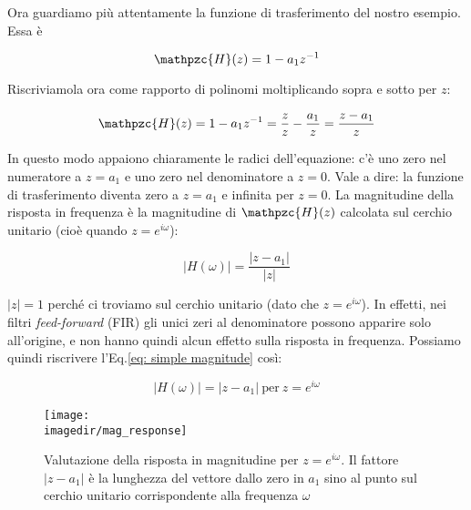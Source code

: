 Ora guardiamo pi\`u attentamente la funzione di trasferimento del nostro
esempio. Essa \`e

\begin{equation}\label{eq: simple transfer function 2}
				\mathpzc{H} ( z ) = 1 - a_1 z^{-1}
\end{equation}

Riscriviamola ora come rapporto di polinomi moltiplicando sopra e sotto per $z$:

\begin{equation}\label{eq: simple transfer function 3}
				\mathpzc{H} ( z ) = 1 - a_1 z^{-1} = \frac{z}{z} - \frac{a_1}{z} = \frac{z - a_1}{z}
\end{equation}

In questo modo appaiono chiaramente le radici dell'equazione:
c'\`e uno zero nel numeratore a $z = a_1$ e uno zero nel denominatore a $z = 0$. Vale a dire:
la funzione di trasferimento diventa zero a $z = a_1$ e infinita per $z = 0$.
La magnitudine della risposta in frequenza \`e la magnitudine di $\mathpzc{H} ( z )$
calcolata sul cerchio unitario (cio\`e quando $z = e^{i \omega}$):

\begin{equation}\label{eq: simple magnitude}
	| H ( \omega ) | = \frac{| z - a_1 |}{| z |}
\end{equation}

$| z | = 1$ perch\'e ci troviamo sul cerchio unitario (dato che $z = e^{i \omega}$).
In effetti, nei filtri \emph{feed-forward} (FIR) gli unici zeri al
denominatore possono apparire solo all'origine, e non hanno quindi alcun
effetto sulla risposta in frequenza. Possiamo quindi riscrivere l'Eq.\ref{eq: simple magnitude}
cos\`i:

\begin{equation}\label{eq: simple magnitude rewritten}
				| H ( \omega ) | = | z - a_1 |~\text{per}~z = e^{i \omega}
\end{equation}
\begin{figure}[htp]
\begin{center}
				\texttt{[image: \\imagedir/mag\_response]}
				\caption{Valutazione della risposta in magnitudine per $z = e^{i
				\omega}$. Il fattore $|z - a_1|$ \`e la lunghezza del vettore dallo
				zero in $a_1$ sino al punto sul cerchio unitario corrispondente alla
				frequenza $\omega$\label{fig:mag response}}
\end{center}
\end{figure}

